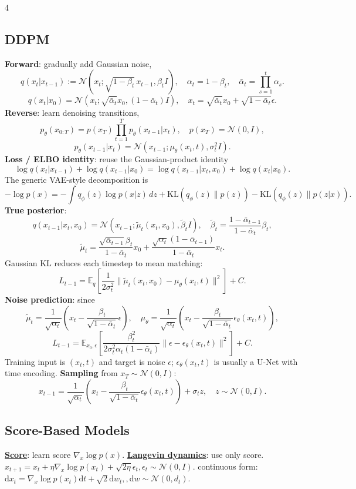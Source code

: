 \documentclass{article}
\newcommand{\key}[1]{\textbf{#1}}
\newcommand{\lowterm}[1]{\textbf{\underline{#1}}}
\newcommand{\E}{\mathbb{E}}
\newcommand{\N}{\mathcal{N}}
\newcommand{\KL}{\mathrm{KL}}
\newcommand{\1}{\mathbf 1}
\newcommand{\dd}{\mathrm{d}}
\begin{document}
\begin{multicols*}{4}
\subsection{DDPM}
\key{Forward}: gradually add Gaussian noise,
\[
q(x_t|x_{t-1}):=\N(x_t;\sqrt{1-\beta_t}\,x_{t-1},\beta_tI),\quad
\alpha_t=1-\beta_t,\quad \bar\alpha_t=\prod_{s=1}^t\alpha_s.
\]
\[
q(x_t|x_0)=\N(x_t;\sqrt{\bar\alpha_t}x_0,(1-\bar\alpha_t)I),\quad
x_t=\sqrt{\bar\alpha_t}x_0+\sqrt{1-\bar\alpha_t}\epsilon.
\]
\key{Reverse}: learn denoising transitions,
\[
p_\theta(x_{0:T})=p(x_T)\prod_{t=1}^Tp_\theta(x_{t-1}|x_t),\quad
p(x_T)=\N(0,I),
\]
\[
p_\theta(x_{t-1}|x_t)=\N(x_{t-1};\mu_\theta(x_t,t),\sigma_t^2I).
\]
\key{Loss / ELBO identity}: reuse the Gaussian-product identity
\[
\log q(x_t|x_{t-1})+\log q(x_{t-1}|x_0)
=\log q(x_{t-1}|x_t,x_0)+\log q(x_t|x_0).
\]
The generic VAE-style decomposition is
\[
-\log p(x)=-\int q_\phi(z)\log p(x|z)\,dz
+\KL(q_\phi(z)\|p(z))-\KL(q_\phi(z)\|p(z|x)).
\]
\key{True posterior}:
\[
q(x_{t-1}|x_t,x_0)=\N(x_{t-1};\tilde\mu_t(x_t,x_0),\tilde\beta_tI),
\quad
\tilde\beta_t=\frac{1-\bar\alpha_{t-1}}{1-\bar\alpha_t}\beta_t,
\]
\[
\tilde\mu_t=
\frac{\sqrt{\bar\alpha_{t-1}}\beta_t}{1-\bar\alpha_t}x_0+
\frac{\sqrt{\alpha_t}(1-\bar\alpha_{t-1})}{1-\bar\alpha_t}x_t.
\]
Gaussian KL reduces each timestep to mean matching:
\[
L_{t-1}=\E_q\left[\frac1{2\sigma_t^2}
\|\tilde\mu_t(x_t,x_0)-\mu_\theta(x_t,t)\|^2\right]+C.
\]
\key{Noise prediction}: since
\[
\tilde\mu_t=
\frac1{\sqrt{\alpha_t}}\left(x_t-\frac{\beta_t}{\sqrt{1-\bar\alpha_t}}\epsilon\right),
\quad
\mu_\theta=
\frac1{\sqrt{\alpha_t}}\left(x_t-\frac{\beta_t}{\sqrt{1-\bar\alpha_t}}\epsilon_\theta(x_t,t)\right),
\]
\[
L_{t-1}=\E_{x_0,\epsilon}\left[
\frac{\beta_t^2}{2\sigma_t^2\alpha_t(1-\bar\alpha_t)}
\|\epsilon-\epsilon_\theta(x_t,t)\|^2\right]+C.
\]
Training input is $(x_t,t)$ and target is noise $\epsilon$; $\epsilon_\theta(x_t,t)$ is usually a U-Net with time encoding. \key{Sampling} from $x_T\sim\N(0,I)$:
\[
x_{t-1}=
\frac1{\sqrt{\alpha_t}}\left(x_t-\frac{\beta_t}{\sqrt{1-\bar\alpha_t}}\epsilon_\theta(x_t,t)\right)+\sigma_tz,\quad z\sim\N(0,I).
\]

\subsection{Score-Based Models}
\lowterm{Score}: learn score $\nabla_x \log p(x)$. \lowterm{Langevin dynamics}: use only score. $x_{t+1}=x_t+\eta \nabla_x \log p(x_t)+\sqrt{2\eta}\epsilon_t, \epsilon_t\sim \N(0,I)$. continuous form: $\dd x_t=\nabla_x \log p(x_t)\dd t+\sqrt{2}\dd w_t,, \dd w\sim\N(0,d_t)$. 



\end{multicols*}
\end{document}
